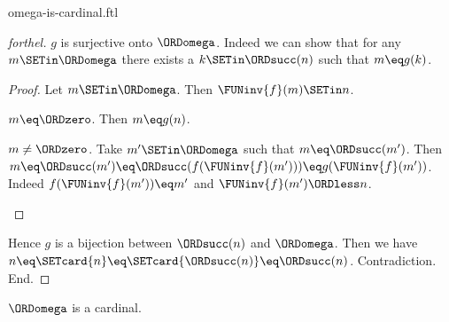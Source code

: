 \documentclass{naproche-library}
\begin{document}
\begin{smodule}[title=$\omega$ is a Cardinal Number]{omega-is-cardinal.ftl}
\begin{proof}[forthel]
    $g$ is surjective onto $\ORDomega$.
    Indeed we can show that for any $m \SETin \ORDomega$ there exists a $k \SETin \ORDsucc(n)$ such that $m \eq g(k)$.
    \begin{proof}
      Let $m \SETin \ORDomega$.
      Then $\FUNinv{f}(m) \SETin n$.

      \begin{case}{$m \eq \ORDzero$.}
        Then $m \eq g(n)$.
      \end{case}

      \begin{case}{$m \neq \ORDzero$.}
        Take $m' \SETin \ORDomega$ such that $m \eq \ORDsucc(m')$.
        Then $m
          \eq \ORDsucc(m')
          \eq \ORDsucc(f(\FUNinv{f}(m')))
          \eq g(\FUNinv{f}(m'))$.
        Indeed $f(\FUNinv{f}(m')) \eq m'$ and $\FUNinv{f}(m') \ORDless n$.
      \end{case}
    \end{proof}

    Hence $g$ is a bijection between $\ORDsucc(n)$ and $\ORDomega$.
    Then we have $n
      \eq \SETcard{n}
      \eq \SETcard{\ORDsucc(n)}
      \eq \ORDsucc(n)$.
    Contradiction.
  End.
\end{proof}

\begin{corollary}[forthel,id=SET_THEORY_07_2717623053713408]
  $\ORDomega$ is a cardinal.
\end{corollary}
\end{smodule}
\end{document}
